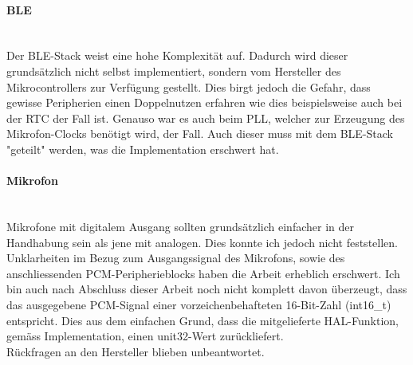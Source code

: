 \documentclass[12pt]{article}
\begin{document}
	\paragraph{BLE}\mbox{}\\
	Der BLE-Stack weist eine hohe Komplexität auf. Dadurch wird dieser grund\-sätzlich nicht selbst implementiert, sondern vom Hersteller des Mikrocontrollers zur Verfügung gestellt. Dies birgt jedoch die Gefahr, dass gewisse Peripherien einen Doppelnutzen erfahren wie dies beispielsweise auch bei der RTC der Fall ist. Genauso war es auch beim PLL, welcher zur Erzeugung des Mikrofon-Clocks benötigt wird, der Fall. Auch dieser muss mit dem BLE-Stack "geteilt" werden, was die Implementation erschwert hat. 
	\paragraph{Mikrofon}\mbox{}\\
	Mikrofone mit digitalem Ausgang sollten grundsätzlich einfacher in der Handhabung sein als jene mit analogen. Dies konnte ich jedoch nicht feststellen. Unklarheiten im Bezug zum Ausgangssignal des Mikrofons, sowie des anschliessenden PCM-Peripherieblocks haben die Arbeit erheblich erschwert. Ich bin auch nach Abschluss dieser Arbeit noch nicht komplett davon überzeugt, dass das ausgegebene PCM-Signal einer vorzeichenbehafteten 16-Bit-Zahl (int16\_t) entspricht. Dies aus dem einfachen Grund, dass die mitgelieferte HAL-Funktion, gemäss Implementation, einen unit32-Wert zurückliefert. \\ Rückfragen an den Hersteller blieben unbeantwortet.
	
	\newpage
\end{document}
